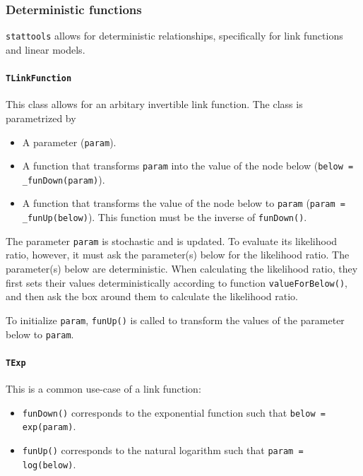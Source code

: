 \documentclass[a4paper,11pt]{article}
\def\stattools{\texttt{stattools}}
\newcommand{\class}[1]{\texttt{#1}}
\newcommand{\privparam}[1]{\texttt{\textunderscore #1}}
\newcommand{\privfunc}[1]{\texttt{\textunderscore#1()}}
\newcommand{\pubfunc}[1]{\texttt{#1()}}
\begin{document}
\subsubsection{Deterministic functions}

\stattools{} allows for deterministic relationships, specifically for link functions and linear models.

\paragraph{\class{TLinkFunction}}

This class allows for an arbitary invertible link function. The class is parametrized by
\begin{itemize}
 \item A parameter (\privparam{param}).
 \item A function that transforms \privparam{param} into the value of the node below (\texttt{below = \_funDown(param)}).
 \item A function that transforms the value of the node below to \privparam{param} (\texttt{param = \_funUp(below)}). This function must be the inverse of \privfunc{funDown}.
\end{itemize}

The parameter \privparam{param} is stochastic and is updated. To evaluate its likelihood ratio, however, it must ask the parameter(s) below for the likelihood ratio. The parameter(s) below are deterministic. When calculating the likelihood ratio, they first sets their values deterministically according to function \pubfunc{valueForBelow}, and then ask the box around them to calculate the likelihood ratio.

To initialize \privparam{param}, \privfunc{funUp} is called to transform the values of the parameter below to \privparam{param}.

\paragraph{\class{TExp}}

This is a common use-case of a link function:

\begin{itemize}
 \item \privfunc{funDown} corresponds to the exponential function such that \texttt{below = exp(param)}.
  \item \privfunc{funUp} corresponds to the natural logarithm such that \texttt{param = log(below)}.
\end{itemize}
\end{document}
